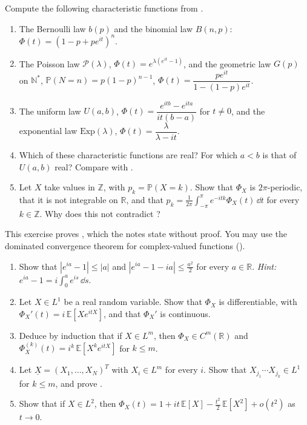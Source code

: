 
\begin{exercise}\label{ex:cf-standard}
\easy Compute the following characteristic functions from .
\begin{enumerate}[label=(\alph*)]
  \item The Bernoulli law $b(p)$ and the binomial law $B(n,p)$:
    $\Phi(t)=(1-p+pe^{it})^n$.
  \item The Poisson law $\mathcal P(\lambda)$, $\Phi(t)=e^{\lambda(e^{it}-1)}$, and the geometric
    law $G(p)$ on $\mathbb N^*$, $\mathbb P(N=n)=p(1-p)^{n-1}$, $\Phi(t)=\dfrac{pe^{it}}{1-(1-p)e^{it}}$.
  \item The uniform law $U(a,b)$, $\Phi(t)=\dfrac{e^{itb}-e^{ita}}{it(b-a)}$ for $t\ne0$, and the
    exponential law $\mathrm{Exp}(\lambda)$, $\Phi(t)=\dfrac\lambda{\lambda-it}$.
  \item Which of these characteristic functions are real? For which $a<b$ is that of $U(a,b)$
    real? Compare with .
  \item Let $X$ take values in $\mathbb Z$, with $p_k=\mathbb P(X=k)$. Show that $\Phi_X$ is
    $2\pi$-periodic, that it is not integrable on $\mathbb R$, and that
    $p_k=\frac1{2\pi}\int_{-\pi}^{\pi}e^{-itk}\Phi_X(t)\,\dd t$ for every $k\in\mathbb Z$. Why does
    this not contradict ?
\end{enumerate}
\end{exercise}

\begin{exercise}\label{ex:cf-derivatives}
\medium This exercise proves , which the notes state without proof. You
may use the dominated convergence theorem for complex-valued functions
().
\begin{enumerate}[label=(\alph*)]
  \item Show that $|e^{ia}-1|\le|a|$ and $|e^{ia}-1-ia|\le\frac{a^2}2$ for every $a\in\mathbb R$.
    \emph{Hint:} $e^{ia}-1=i\int_0^ae^{is}\,\dd s$.
  \item Let $X\in L^1$ be a real random variable. Show that $\Phi_X$ is differentiable, with
    $\Phi_X'(t)=i\,\mathbb E[Xe^{itX}]$, and that $\Phi_X'$ is continuous.
  \item Deduce by induction that if $X\in L^m$, then $\Phi_X\in C^m(\mathbb R)$ and
    $\Phi_X^{(k)}(t)=i^k\,\mathbb E[X^ke^{itX}]$ for $k\le m$.
  \item Let $\underline X=(X_1,\dots,X_N)^T$ with $X_i\in L^m$ for every $i$. Show that
    $X_{j_1}\cdots X_{j_k}\in L^1$ for $k\le m$, and prove .
  \item Show that if $X\in L^2$, then
    $\Phi_X(t)=1+it\,\mathbb E[X]-\frac{t^2}2\,\mathbb E[X^2]+o(t^2)$ as $t\to0$.
\end{enumerate}
\end{exercise}

